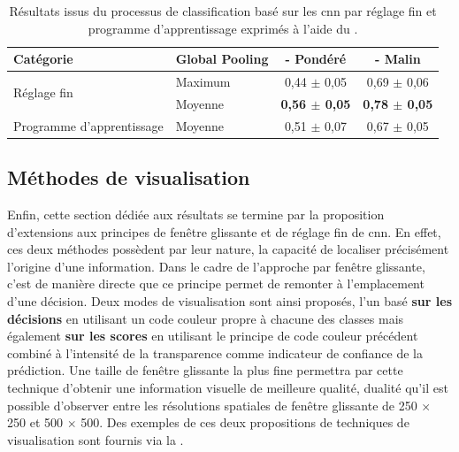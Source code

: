 \begin{table}[H]
    \centering
    \begin{tabular}{llcc}
        \toprule
        Catégorie                               & Global Pooling                    & \Fscore{} - Pondéré                           & \Fscore{} - Malin                             \\ \midrule
        \multirow{2}{*}{Réglage fin}            & Maximum                           & 0,44 $\pm$ 0,05                                 & 0,69 $\pm$ 0,06                                 \\ \cline{2-4}
                                                & \cellcolor[HTML]{E7E6E6}Moyenne   & \cellcolor[HTML]{E7E6E6}\textbf{0,56 $\pm$ 0,05}& \cellcolor[HTML]{E7E6E6}\textbf{0,78 $\pm$ 0,05}\\ \midrule
        Programme d'apprentissage               & Moyenne                           & 0,51 $\pm$ 0,07                                 & 0,67 $\pm$ 0,05                                 \\
        \bottomrule
    \end{tabular}
    
    \caption{Résultats issus du processus de classification basé sur les \gls{cnn} par réglage fin et programme d'apprentissage exprimés à l'aide du \fscore.}
    \label{tab:parameters_image_improvement_fine}
\end{table}
\clearpage

\subsection{Méthodes de visualisation}
Enfin, cette section dédiée aux résultats se termine par la proposition d'extensions aux principes de fenêtre glissante et de réglage fin de \gls{cnn}. En effet, ces deux méthodes possèdent par leur nature, la capacité de localiser précisément l'origine d'une information. Dans le cadre de l'approche par fenêtre glissante, c'est de manière directe que ce principe permet de remonter à l'emplacement d'une décision. Deux modes de visualisation sont ainsi proposés, l'un basé \textbf{sur les décisions} en utilisant un code couleur propre à chacune des classes mais également \textbf{sur les scores} en utilisant le principe de code couleur précédent combiné à l'intensité de la transparence comme indicateur de confiance de la prédiction. Une taille de fenêtre glissante la plus fine permettra par cette technique d'obtenir une information visuelle de meilleure qualité, dualité qu'il est possible d'observer entre les résolutions spatiales de fenêtre glissante de 250 $\times$ 250 et 500 $\times$ 500. Des exemples de ces deux propositions de techniques de visualisation sont fournis via la .\par

